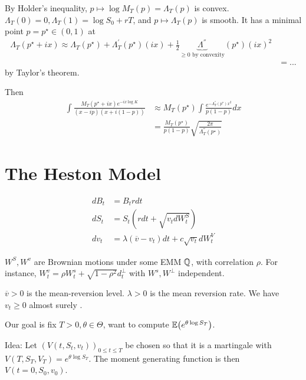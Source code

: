 \begin{remark}
  By Holder's inequality, $p \mapsto \log M_{T}(p) = \Lambda_{T}(p)$ is
  convex.  $\Lambda_{T}(0) = 0, \Lambda_{T}(1) = \log S_{0} + rT$, and
  $p \mapsto \Lambda_{T}(p)$ is smooth.  It has a minimal point $p =
  p^{\star} \in (0, 1)$ at
  \begin{align}
    \label{eq:123}
    \Lambda_{T}(p^{\star} + ix) \approx \Lambda_{T}(p^{\star}) +
    \Lambda_{T}^{'}(p^{\star})(ix) + \frac{1}{2}
    \underbrace{\Lambda^{''}}_{\text{$\geq 0$ by convexity}}(p^{\star})(ix)^{2} \\
    &= ...
  \end{align}  by Taylor's theorem.

  Then
  \begin{align}
    \label{eq:124}
    \int \frac{M_{T}(p^{\star} + ix) e^{-ix \log K}}{(x - ip)(x +
      i(1-p))} &\approx M_{T}(p^{\star}) \int
    \frac{e^{-\Lambda_{T}^{''}(p^{\star}) x^{2}}}{p(1-p)} dx \\
    &= \frac{M_{T}(p^{\star})}{p(1-p)} \sqrt{\frac{2\pi}{\Lambda_{T}^{''}(p^{\star})}}
  \end{align}
\end{remark}

\section{The Heston Model}
\label{sec:heston-model}

\begin{align}
  \label{eq:125}
  dB_{t} &= B_{t} r dt \\
  dS_{t} &= S_{t} (r dt + \sqrt{v_{t} dW_{t}^{S}}) \\
  dv_{t} &= \lambda (\overline v - v_{t}) dt + c \sqrt{v_{t}}
  dW^{V}_{t}
\end{align}

$W^{S}, W^{v}$ are Brownian motions under some EMM $\Q$, with
correlation $\rho$.  For instance, $W_{t}^{v} = \rho W_{t}^{s} +
\sqrt{1-\rho^{2}} d_{t}^{\perp}$ with $W^{s}, W^{\perp}$ independent.

$\overline v > 0$ is the mean-reversion level.  $\lambda > 0$ is the
mean reversion rate.  We have $v_{t} \geq 0$ almost surely \citep{cox1985theory}.

Our goal is fix $T > 0, \theta \in \Theta$, want to compute
$\E{e^{\theta \log S_{T}}}$. 

Idea: Let $(V(t, S_{t}, v_{t}))_{0 \leq t \leq T}$ be chosen so that
it is a martingale with $V(T, S_{T}, V_{T}) = e^{\theta \log S_{T}}$.
The moment generating function is then $V(t=0, S_{0}, v_{0})$.

